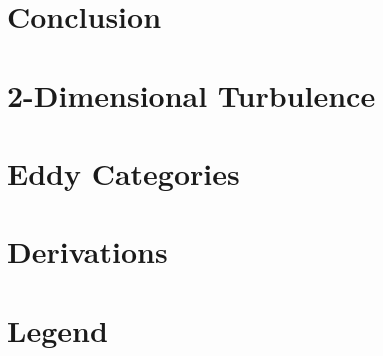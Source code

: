 
\appendix
\begin{appendices}
\begin{small}



\chapter{Conclusion}

\chapter{2-Dimensional Turbulence}

\chapter{Eddy Categories}

\chapter{Derivations}


\chapter{Legend}



\end{small}
\end{appendices}
\FloatBarrier



